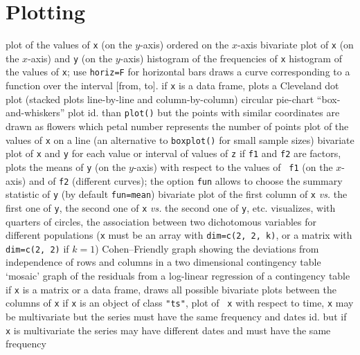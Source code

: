 \section{Plotting}{}
	{plot of the values of {\tt x} (on the $y$-axis) ordered on the
$x$-axis}
	{bivariate plot of {\tt x} (on the $x$-axis) and {\tt y}
(on the $y$-axis)}
	{histogram of the frequencies of {\tt x}}
	{histogram of the values of {\tt x}; use {\tt horiz=F} for
horizontal bars}
	{draws a curve corresponding to a function over the interval
[from, to].}
	{if {\tt x} is a data frame, plots a Cleveland dot plot
(stacked plots line-by-line and column-by-column)}
	{ circular pie-chart}
	{ ``box-and-whiskers'' plot}
	{id. than {\tt plot()} but the points with similar
coordinates are drawn as flowers which petal number represents the number of
points}
	{plot of the values of {\tt x} on a line (an alternative to
{\tt boxplot()} for small sample sizes)}
	{bivariate plot of {\tt x} and {\tt y} for each
value or interval of values of {\tt z}}
	{if {\tt f1} and {\tt f2} are factors,
plots the means of {\tt y} (on the $y$-axis) with respect to the values of {\tt
f1} (on the $x$-axis) and of {\tt f2} (different curves); the option {\tt fun}
allows to choose the summary statistic of {\tt y} (by default {\tt fun=mean})}
	{bivariate plot of the first column of {\tt x} {\it vs.}
the first one of {\tt y}, the second one of {\tt x} {\it vs.} the second one of
{\tt y}, etc.}
	{visualizes, with quarters of circles, the association
between two dichotomous variables for different populations ({\tt x} must be an
array with {\tt dim=c(2, 2, k)}, or a matrix with {\tt dim=c(2, 2)} if $k=1$)}
	{ Cohen--Friendly graph showing the deviations  from
independence of rows and columns in a two dimensional contingency table}
	{ `mosaic' graph of the residuals from a log-linear
regression of a contingency table}
	{if {\tt x} is a matrix or a data frame, draws all possible
bivariate plots between the columns of {\tt x}}
	{if {\tt x} is an object of class {\tt "ts"}, plot of {\tt
x} with respect to time, {\tt x}  may be multivariate but the series must have
the same frequency and dates}
	{id. but if {\tt x} is multivariate the series may have
different dates and must have the same frequency}
